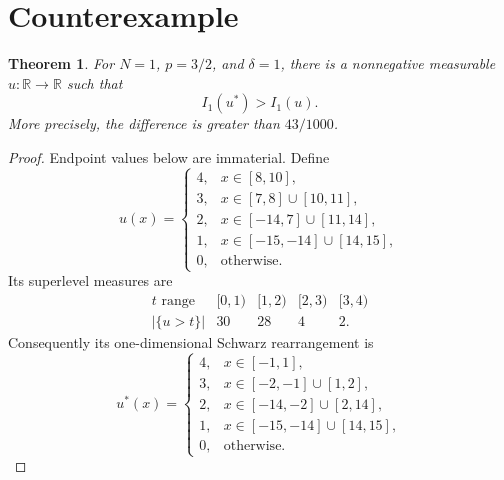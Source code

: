 \documentclass[11pt]{article}
\newtheorem{theorem}{Theorem}
\begin{document}
\section{Counterexample}

\begin{theorem}\label{thm:main}
For $N=1$, $p=3/2$, and $\delta=1$, there is a nonnegative measurable
$u:\mathbb R\to\mathbb R$ such that
\[
 I_1(u^*)>I_1(u).
\]
More precisely, the difference is greater than $43/1000$.
\end{theorem}

\begin{proof}
Endpoint values below are immaterial.  Define
\[
u(x)=
\begin{cases}
4,&x\in[8,10],\\
3,&x\in[7,8]\cup[10,11],\\
2,&x\in[-14,7]\cup[11,14],\\
1,&x\in[-15,-14]\cup[14,15],\\
0,&\text{otherwise}.
\end{cases}
\]
Its superlevel measures are
\[
\begin{array}{c|cccc}
t\text{ range}&[0,1)&[1,2)&[2,3)&[3,4)\\ \hline
|\{u>t\}|&30&28&4&2.
\end{array}
\]
Consequently its one-dimensional Schwarz rearrangement is
\[
u^*(x)=
\begin{cases}
4,&x\in[-1,1],\\
3,&x\in[-2,-1]\cup[1,2],\\
2,&x\in[-14,-2]\cup[2,14],\\
1,&x\in[-15,-14]\cup[14,15],\\
0,&\text{otherwise}.
\end{cases}
\]


\end{proof}
\end{document}

